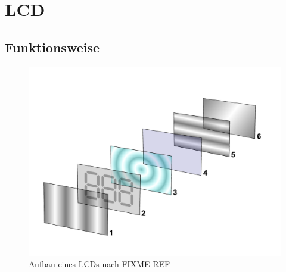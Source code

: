 \section{LCD}
\subsection{Funktionsweise}

\begin{figure}[t]
  \centering
  \includegraphics[width=\linewidth, keepaspectratio]{Bilder/LCD_layers}
  \caption{Aufbau eines LCDs nach FIXME REF}
  \label{lcdaufbau}
\end{figure}

